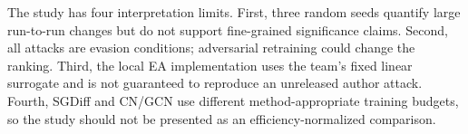 \documentclass[11pt]{article}
\begin{document}
The study has four interpretation limits. First, three random seeds quantify
large run-to-run changes but do not support fine-grained significance claims.
Second, all attacks are evasion conditions; adversarial retraining could change
the ranking. Third, the local EA implementation uses the team's fixed linear
surrogate and is not guaranteed to reproduce an unreleased author attack.
Fourth, SGDiff and CN/GCN use different method-appropriate training budgets,
so the study should not be presented as an efficiency-normalized comparison.



\end{document}
